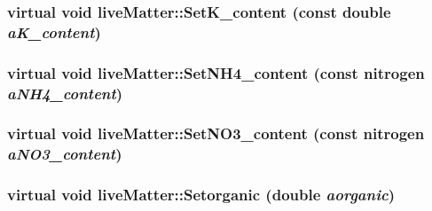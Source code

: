 \label{classlive_matter_aee8cb3a1d73625321b1b73dd285dffb4}
\hypertarget{classlive_matter_ab290a7267fcd85285cfa72a7eec34adc}{
\subsubsection[{SetK\_\-content}]{\setlength{\rightskip}{0pt plus 5cm}virtual void liveMatter::SetK\_\-content (const double {\em aK\_\-content})}}
\label{classlive_matter_ab290a7267fcd85285cfa72a7eec34adc}
\hypertarget{classlive_matter_ae1c5d6b2f85882a85817e26a8fc9391f}{
\subsubsection[{SetNH4\_\-content}]{\setlength{\rightskip}{0pt plus 5cm}virtual void liveMatter::SetNH4\_\-content (const {\bf nitrogen} {\em aNH4\_\-content})}}
\label{classlive_matter_ae1c5d6b2f85882a85817e26a8fc9391f}
\hypertarget{classlive_matter_a59f7f829cb7bfe4f8de9d39921d2d63e}{
\subsubsection[{SetNO3\_\-content}]{\setlength{\rightskip}{0pt plus 5cm}virtual void liveMatter::SetNO3\_\-content (const {\bf nitrogen} {\em aNO3\_\-content})}}
\label{classlive_matter_a59f7f829cb7bfe4f8de9d39921d2d63e}
\hypertarget{classlive_matter_ac88e0a589454e8a1aaef82408d737027}{
\subsubsection[{Setorganic}]{\setlength{\rightskip}{0pt plus 5cm}virtual void liveMatter::Setorganic (double {\em aorganic})}}
